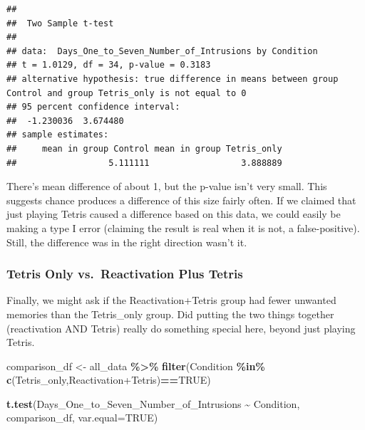 \documentclass[
]{book}
\newenvironment{Shaded}{\begin{snugshade}}{\end{snugshade}}
\newcommand{\AttributeTok}[1]{\textcolor[rgb]{0.13,0.29,0.53}{#1}}
\newcommand{\ConstantTok}[1]{\textcolor[rgb]{0.56,0.35,0.01}{#1}}
\newcommand{\FunctionTok}[1]{\textcolor[rgb]{0.13,0.29,0.53}{\textbf{#1}}}
\newcommand{\NormalTok}[1]{#1}
\newcommand{\OtherTok}[1]{\textcolor[rgb]{0.56,0.35,0.01}{#1}}
\newcommand{\SpecialCharTok}[1]{\textcolor[rgb]{0.81,0.36,0.00}{\textbf{#1}}}
\newcommand{\StringTok}[1]{\textcolor[rgb]{0.31,0.60,0.02}{#1}}
\begin{document}
\begin{verbatim}
## 
##  Two Sample t-test
## 
## data:  Days_One_to_Seven_Number_of_Intrusions by Condition
## t = 1.0129, df = 34, p-value = 0.3183
## alternative hypothesis: true difference in means between group Control and group Tetris_only is not equal to 0
## 95 percent confidence interval:
##  -1.230036  3.674480
## sample estimates:
##     mean in group Control mean in group Tetris_only 
##                  5.111111                  3.888889
\end{verbatim}

There's mean difference of about 1, but the p-value isn't very small. This suggests chance produces a difference of this size fairly often. If we claimed that just playing Tetris caused a difference based on this data, we could easily be making a type I error (claiming the result is real when it is not, a false-positive). Still, the difference was in the right direction wasn't it.

\hypertarget{tetris-only-vs.-reactivation-plus-tetris}{%
\subsubsection{Tetris Only vs.~Reactivation Plus Tetris}\label{tetris-only-vs.-reactivation-plus-tetris}}

Finally, we might ask if the Reactivation+Tetris group had fewer unwanted memories than the Tetris\_only group. Did putting the two things together (reactivation AND Tetris) really do something special here, beyond just playing Tetris.

\begin{Shaded}
\begin{Highlighting}[]
\NormalTok{comparison\_df }\OtherTok{\textless{}{-}}\NormalTok{ all\_data }\SpecialCharTok{\%\textgreater{}\%} 
                  \FunctionTok{filter}\NormalTok{(Condition }\SpecialCharTok{\%in\%} \FunctionTok{c}\NormalTok{(}\StringTok{\textquotesingle{}Tetris\_only\textquotesingle{}}\NormalTok{,}\StringTok{\textquotesingle{}Reactivation+Tetris\textquotesingle{}}\NormalTok{)}\SpecialCharTok{==}\ConstantTok{TRUE}\NormalTok{)}
                        
\FunctionTok{t.test}\NormalTok{(Days\_One\_to\_Seven\_Number\_of\_Intrusions }\SpecialCharTok{\textasciitilde{}}\NormalTok{ Condition, }
\NormalTok{       comparison\_df,}
       \AttributeTok{var.equal=}\ConstantTok{TRUE}\NormalTok{)}
\end{Highlighting}
\end{Shaded}
\end{document}
